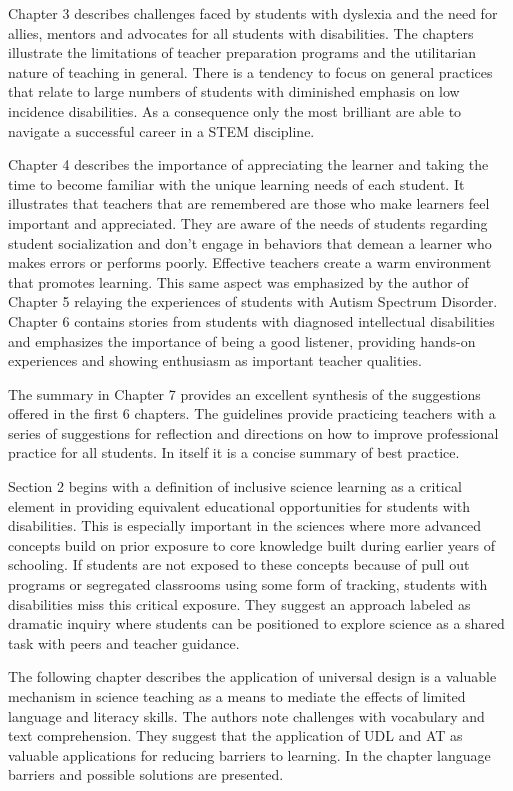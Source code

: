 \documentclass[11.5pt]{sig-alternate} %
\begin{document}
\begin{large}
Chapter 3 describes challenges faced by students with dyslexia and the need for allies, mentors and advocates for all students with disabilities.  The chapters illustrate the limitations of teacher preparation programs and the utilitarian nature of teaching in general. There is a tendency to focus on general practices that relate to large numbers of students with diminished emphasis on low incidence disabilities.  As a consequence only the most brilliant are able to navigate a successful career in a STEM discipline.

Chapter 4 describes the importance of appreciating the learner and taking the time to become familiar with the unique learning needs of each student.  It illustrates that teachers that are remembered are those who make learners feel important and appreciated.  They are aware of the needs of students regarding student socialization and don’t engage in behaviors that demean a learner who makes errors or performs poorly. Effective teachers create a warm environment that promotes learning. This same aspect was emphasized by the author of Chapter 5 relaying the experiences of students with Autism Spectrum Disorder.  Chapter 6 contains stories from students with diagnosed intellectual disabilities and emphasizes the importance of being a good listener, providing hands-on experiences and showing enthusiasm as important teacher qualities.

The summary in Chapter 7 provides an excellent synthesis of the suggestions offered in the first 6 chapters.  The guidelines provide practicing teachers with a series of suggestions for reflection and directions on how to improve professional practice for all students.  In itself it is a concise summary of best practice.

Section 2 begins with a definition of inclusive science learning as a critical element in providing equivalent educational opportunities for students with disabilities.  This is especially important in the sciences where more advanced concepts build on prior exposure to core knowledge built during earlier years of schooling.  If students are not exposed to these concepts because of pull out programs or segregated classrooms using some form of tracking, students with disabilities miss this critical exposure. They suggest an approach labeled as dramatic inquiry where students can be positioned to explore science as a shared task with peers and teacher guidance.

The following chapter describes the application of universal design is a valuable mechanism in science teaching as a means to mediate the effects of limited language and literacy skills.  The authors note challenges with vocabulary and text comprehension. They suggest that the application of UDL and AT as valuable applications for reducing barriers to learning.  In the chapter language barriers and possible solutions are presented.


\end{large}
\end{document}
